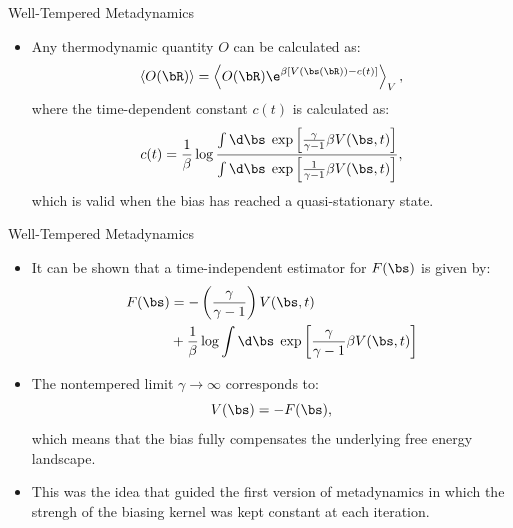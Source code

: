 \documentclass[10pt]{beamer}
\begin{document}
\begin{frame}{Well-Tempered Metadynamics}
\begin{itemize}
\setlength\itemsep{1em}
  \item Any thermodynamic quantity $O$ can be calculated as:
  \begin{equation}
    \left< O(\bR) \right> = \left< O(\bR) \e^{\beta [V(\bs(\bR))-c(t)]} \right>_V,
  \end{equation}
  where the time-dependent constant $c(t)$ is calculated as:
  \begin{equation}
    c(t) = \frac{1}{\beta}\log\frac{\int\d\bs\;\exp\left[ \frac{\gamma}{\gamma-1}\beta V(\bs,t) \right]}{\int\d\bs\;\exp\left[ \frac{1}{\gamma-1}\beta V(\bs,t) \right]},
  \end{equation}
  which is valid when the bias has reached a quasi-stationary state.
\end{itemize}
\end{frame}

\begin{frame}{Well-Tempered Metadynamics}
\begin{itemize}
\setlength\itemsep{1em}
  \item It can be shown that a time-independent estimator for $F(\bs)$ is given by:
  \begin{align}
    F(\bs) &= -\left( \frac{\gamma}{\gamma-1} \right)V(\bs, t) \nonumber\\
           &+ \frac{1}{\beta}\log\int\d\bs\; \exp\left[ \frac{\gamma}{\gamma-1} \beta V(\bs,t) \right]
  \end{align}

  \item The nontempered limit $\gamma\to\infty$ corresponds to:
  \begin{equation}
    V(\bs) = -F(\bs),
  \end{equation}
  which means that the bias fully compensates the underlying free energy landscape.

  \item This was the idea that guided the first version of metadynamics in which the strengh of the biasing kernel was kept constant at each iteration.
\end{itemize}
\end{frame}
\end{document}
